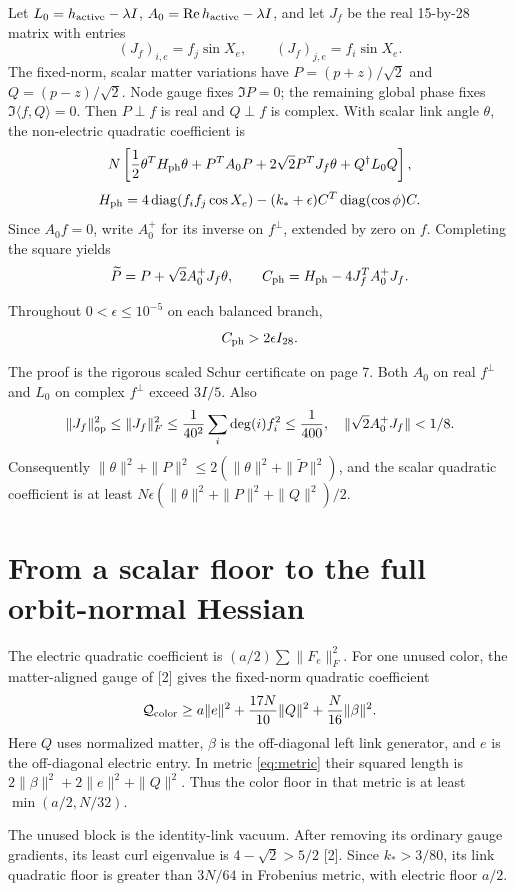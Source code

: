 \documentclass[11pt,a4paper]{article}
\begin{document}
Let $L_0=h_{\rm active}-\lambda I$, $A_0=\operatorname{Re} h_{\rm active}-\lambda I$, and let $J_f$ be the real 15-by-28 matrix with entries
\[
(J_f)_{i,e}=f_j\sin X_e,\qquad(J_f)_{j,e}=f_i\sin X_e.
\]
The fixed-norm, scalar matter variations have $P=(p+z)/\sqrt2$ and $Q=(p-z)/\sqrt2$. Node gauge fixes $\Im P=0$; the remaining global phase fixes $\Im\langle f,Q\rangle=0$. Then $P\perp f$ is real and $Q\perp f$ is complex. With scalar link angle $\theta$, the non-electric quadratic coefficient is
\[
N\left[\frac12\theta^TH_{\rm ph}\theta+P^TA_0P
+2\sqrt2P^TJ_f\theta+Q^\dagger L_0Q\right],
\]
\[
H_{\rm ph}=4\operatorname{diag}(f_if_j\cos X_e)-(k_*+\epsilon)C^T\operatorname{diag}(\cos\phi)C.
\]
Since $A_0f=0$, write $A_0^+$ for its inverse on $f^\perp$, extended by zero on $f$. Completing the square yields
\[
\widetilde P=P+\sqrt2 A_0^+J_f\theta,\qquad
C_{\rm ph}=H_{\rm ph}-4J_f^TA_0^+J_f.
\]
\begin{lemma}\label{lem:floor}
Throughout $0<\epsilon\le10^{-5}$ on each balanced branch,
\[
C_{\rm ph}>2\epsilon I_{28}.
\]
\end{lemma}
The proof is the rigorous scaled Schur certificate on page 7. Both $A_0$ on real $f^\perp$ and $L_0$ on complex $f^\perp$ exceed $3I/5$. Also
\[
\|J_f\|_{\rm op}^2\le\|J_f\|_F^2
\le\frac1{40^2}\sum_i\deg(i)f_i^2\le\frac1{400},
\quad\|\sqrt2 A_0^+J_f\|<1/8.
\]
Consequently $\|\theta\|^2+\|P\|^2\le2(\|\theta\|^2+\|\widetilde P\|^2)$, and the scalar quadratic coefficient is at least $N\epsilon(\|\theta\|^2+\|P\|^2+\|Q\|^2)/2$.
\newpage
\section{From a scalar floor to the full orbit-normal Hessian}
The electric quadratic coefficient is $(a/2)\sum\|F_e\|_F^2$. For one unused color, the matter-aligned gauge of [2] gives the fixed-norm quadratic coefficient
\[
\mathcal Q_{\rm color}\ge a\|e\|^2+
\frac{17N}{10}\|Q\|^2+\frac N{16}\|\beta\|^2.
\]
Here $Q$ uses normalized matter, $\beta$ is the off-diagonal left link generator, and $e$ is the off-diagonal electric entry. In metric \eqref{eq:metric} their squared length is $2\|\beta\|^2+2\|e\|^2+\|Q\|^2$. Thus the color floor in that metric is at least $\min(a/2,N/32)$.

The unused block is the identity-link vacuum. After removing its ordinary gauge gradients, its least curl eigenvalue is $4-\sqrt2>5/2$ [2]. Since $k_*>3/80$, its link quadratic floor is greater than $3N/64$ in Frobenius metric, with electric floor $a/2$.
\end{document}
